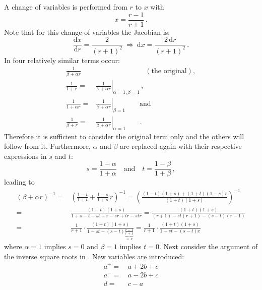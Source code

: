 A change of variables is performed from $r$ to $x$ with
\begin{equation}
  x = \frac{r - 1}{r + 1} \, .
\end{equation}
Note that for this change of variables the Jacobian is:
\begin{equation}
 \frac{\mathrm{d}x}{\mathrm{d}r} = \frac{2}{(r+1)^2} ~ \Rightarrow ~ \mathrm{d}x = \frac{2 \,\mathrm{d}r}{(r+1)^2} \, .
\end{equation}
In  four relatively similar terms occur:
\begin{align}
 \frac{1}{\beta + \alpha r} ~& \qquad \qquad \qquad \quad (\textrm{the original}), \nonumber \\
 \frac{1}{1 + r}            =& \left. \frac{1}{\beta + \alpha r} \right|_{\alpha = 1,
                                                                          \beta  = 1} \, , \nonumber \\
 \frac{1}{1 + \alpha r}     =& \left. \frac{1}{\beta + \alpha r} \right|_{\beta  = 1} \qquad \textrm{and} \nonumber \\
 \frac{1}{\beta + r}        =& \left. \frac{1}{\beta + \alpha r} \right|_{\alpha = 1} \qquad . \nonumber
\end{align}
Therefore it is sufficient to consider the original term only and the others will follow from it.
Furthermore, $\alpha$ and $\beta$ are replaced again with their respective expressions in $s$ and $t$:
\begin{equation}
  s = \frac{1 - \alpha}{1 + \alpha} \quad \mathrm{and} \quad t = \frac{1 - \beta}{1 + \beta} \, ,
\end{equation}
leading to
\begin{align}
  \left( \beta + \alpha r \right)^{-1}
  =& \left( \frac{1-t}{1+t} + \frac{1-s}{1+s} \,r \right)^{-1}
  =  \left( \frac{(1-t)(1+s) + (1+t)(1-s) r}{(1+t)(1+s)} \right)^{-1} \nonumber \\
  =& \frac{(1+t)(1+s)}{1 +s-t -st +r -sr+tr -str}
  =  \frac{(1+t)(1+s)}{(r+1)-st(r+1)-(s-t)(r-1)} \label{eqn:beta_alpha_r} \\
  =& \frac{1}{r+1} \cdot \frac{(1+t)(1+s)}{1-st-(s-t)\underbrace{\frac{r-1}{r+1}}_{=\,x}}
  =  \frac{1}{r+1} \cdot \frac{(1+t)(1+s)}{1-st-(s-t)x} \nonumber
\end{align}
where $\alpha=1$ implies $s=0$ and $\beta=1$ implies $t=0$.
Next consider the argument of the inverse square roots in .
New variables are introduced:
\begin{align}
 a^{+} =&\, a + 2b + c \nonumber \\
 a^{-} =&\, a - 2b + c \\
 d     =&\, c - a \nonumber
\end{align}
